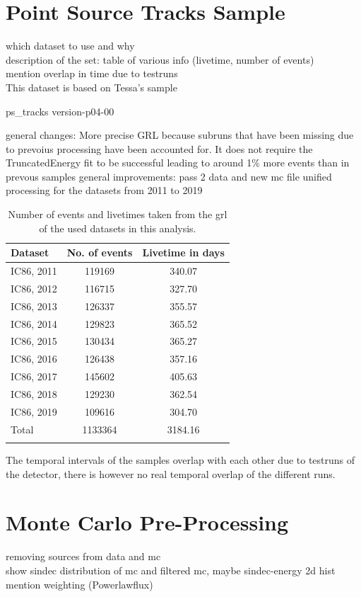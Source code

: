 \section{Point Source Tracks Sample}
which dataset to use and why\\
description of the set: table of various info (livetime, number of events)\\
mention overlap in time due to testruns\\

This dataset is based on Tessa's sample

ps\_tracks version-p04-00

general changes:
More precise GRL because subruns that have been missing due to prevoius processing have been accounted for.
It does not require the TruncatedEnergy fit to be successful leading to around 1\% more events than in prevous samples
general improvements:
pass 2 data and new mc file
unified processing for the datasets from 2011 to 2019


\begin{table}
  \centering
  \caption{Number of events and livetimes taken from the grl of the used datasets in this analysis.}
  \begin{tabular}{lcc}
    \toprule
    Dataset & No. of events & Livetime in days \\
    \toprule
    IC86, 2011 & 119169 & 340.07 \\
    IC86, 2012 & 116715 & 327.70 \\
    IC86, 2013 & 126337 & 355.57 \\
    IC86, 2014 & 129823 & 365.52 \\
    IC86, 2015 & 130434 & 365.27 \\
    IC86, 2016 & 126438 & 357.16 \\
    IC86, 2017 & 145602 & 405.63 \\
    IC86, 2018 & 129230 & 362.54 \\
    IC86, 2019 & 109616 & 304.70 \\
    \hline
    Total & 1133364 & 3184.16 \\
    \toprule
    \label{tab:data}
  \end{tabular}
\end{table}

The temporal intervals of the samples overlap with each other due to testruns of the detector, there is however no real temporal overlap of the different runs.

\section{Monte Carlo Pre-Processing}
removing sources from data and mc\\
show sindec distribution of mc and filtered mc, maybe sindec-energy 2d hist\\
mention weighting (Powerlawflux)\\

